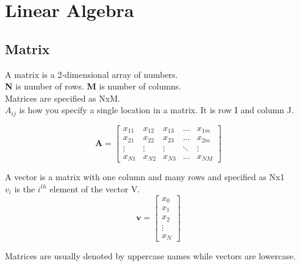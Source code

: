 \section{Linear Algebra}

\subsection{Matrix}

A matrix is a 2-dimensional array of numbers.\\

\textbf{N} is number of rows.  \textbf{M} is number of columns.\\

Matrices are specified as NxM.\\

$A_{ij}$ is how you specify a single location in a matrix.  It is row I and column J.



\begin{equation}
  \textbf{A} = \left[
    \begin{matrix}
      x_{11} & x_{12} & x_{13} & \dots  & x_{1m} \\
      x_{21} & x_{22} & x_{23} & \dots  & x_{2m} \\
      \vdots & \vdots & \vdots & \ddots & \vdots \\
      x_{N1} & x_{N2} & x_{N3} & \dots  & x_{NM}
    \end{matrix}
    \right]
  \label{eqn:BasicMatrix}
\end{equation}

A vector is a matrix with one column and many rows and specified as Nx1\\

$v_i$ is the $i^{th}$ element of the vector V.\\

\begin{equation}
  \textbf{{v}} = \left[
    \begin{matrix}
      x_{0} \\
      x_{1} \\
      x_{2} \\
      \vdots \\
      x_{N}
    \end{matrix}
    \right]
  \label{eqn:BasicVector}
\end{equation}

Matrices are usually denoted by uppercase names while vectors are lowercase.\\

